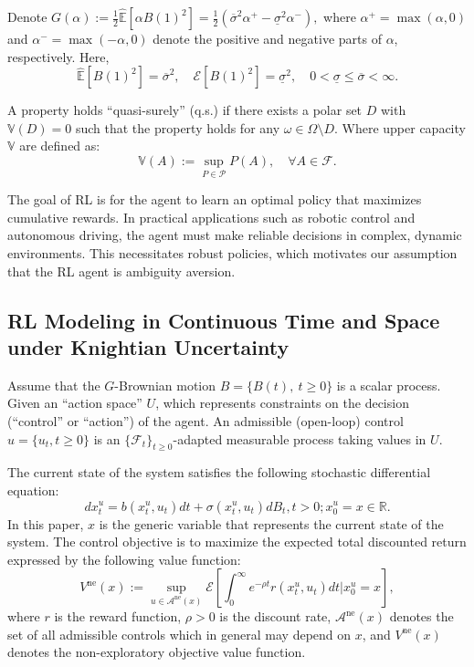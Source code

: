 \documentclass[onecolumn, journal]{IEEEtran} %
\begin{document}
	Denote $
	G(\alpha) := \frac{1}{2} \hat{\mathbb{E}}[\alpha B(1)^2] = \frac{1}{2} (\overline{\sigma}^2 \alpha^+ - \underline{\sigma}^2 \alpha^-),
	$
	where $\alpha^{+} = \max(\alpha, 0)$ and $\alpha^{-} = \max(-\alpha, 0)$ denote the positive and negative parts of $\alpha$, respectively. Here,
	\[
	\hat{\mathbb{E}}[B(1)^2] = \overline{\sigma}^2, \quad \mathcal{E}[B(1)^2] = \underline{\sigma}^2, \quad 0 < \underline{\sigma} \leq \overline{\sigma} < \infty.
	\]
	
	A property holds ``quasi-surely'' (q.s.) if there exists a polar set $D$ with $\mathbb{V}(D) = 0$ such that the property holds for any $\omega \in \Omega \setminus D$. Where upper capacity $\mathbb{V}$
	are defined as: 
	\[
	\mathbb{V}(A) := \sup_{P \in \mathcal{P}} P(A), \quad \forall A \in \mathcal{F}.
	\]
	
	
	
	The goal of RL is for the agent to learn an optimal policy that maximizes cumulative rewards. In practical applications such as robotic control and autonomous driving, the agent must make reliable decisions in complex, dynamic environments. This necessitates robust policies, which motivates our assumption that the RL agent is ambiguity aversion.
	
	\subsection{RL Modeling in Continuous Time and Space under Knightian Uncertainty}
	
	Assume that the $G$-Brownian motion $B = \{ B(t),\ t \geq 0 \}$ is a scalar process. Given an ``action space'' $U$, which represents constraints on the decision (``control'' or ``action'') of the agent. An admissible (open-loop) control $u = \{u_t, t \geq 0\}$ is an $\{\mathcal{F}_t\}_{t \geq 0}$-adapted measurable process taking values in $U$.
	
	The current state of the system satisfies the following stochastic differential equation:
	\begin{equation}\label{eq:1}
		dx_t^u = b \left( x_t^u, u_t \right) dt + \sigma \left( x_t^u, u_t \right) dB_t, t > 0; x_0^u = x \in \mathbb{R}.
		\tag{1}
	\end{equation}
	In this paper, $x$ is the generic variable that represents the current state of the system. The control objective is to maximize the expected total discounted return expressed by the following value function:
	\begin{equation}\label{eq:2}
		V^{\text{ne}}(x) := \sup_{u \in \mathcal{A}^{\text{ne}}(x)} \mathcal{E} \left[ \int_0^\infty e^{-\rho t} r(x_t^u, u_t) dt \bigg| x_0^u = x \right],
		\tag{2}
	\end{equation}
	where $r$ is the reward function, $\rho > 0$ is the discount rate, $\mathcal{A}^{\text{ne}}(x)$ denotes the set of all admissible controls which in general may depend on $x$, and $V^{\text{ne}}(x)$ denotes the non-exploratory objective value function.
	
\end{document}
